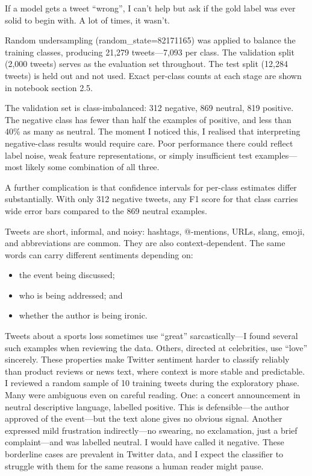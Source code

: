 \documentclass[12pt]{article}
\begin{document}
  If a model gets a tweet ``wrong'', I can't help but ask if the gold label was ever solid to begin with.
  A lot of times, it wasn't.

Random undersampling (random\_state=82171165) was applied to balance the training classes, producing 21,279 tweets---7,093 per class.
The validation split (2,000 tweets) serves as the evaluation set throughout.
The test split (12,284 tweets) is held out and not used.
Exact per-class counts at each stage are shown in notebook section 2.5.

The validation set is class-imbalanced: 312 negative, 869 neutral, 819 positive.
The negative class has fewer than half the examples of positive, and less than 40\% as many as neutral.
The moment I noticed this, I realised that interpreting negative-class results would require care.
Poor performance there could reflect label noise, weak feature representations, or simply insufficient test examples---most likely some combination of all three.

A further complication is that confidence intervals for per-class estimates differ substantially.
With only 312 negative tweets, any F1 score for that class carries wide error bars compared to the 869 neutral examples.

Tweets are short, informal, and noisy: hashtags, @-mentions, URLs, slang, emoji, and abbreviations are common. They are also context-dependent. The same words can carry different sentiments depending on:

\begin{itemize}

  \item the event being discussed;

  \item who is being addressed; and

  \item whether the author is being ironic.

\end{itemize} Tweets about a sports loss sometimes use ``great'' sarcastically---I found several such examples when reviewing the data. Others, directed at celebrities, use ``love'' sincerely. These properties make Twitter sentiment harder to classify reliably than product reviews or news text, where context is more stable and predictable. 
I reviewed a random sample of 10 training tweets during the exploratory phase. Many were ambiguous even on careful reading. One: a concert announcement in neutral descriptive language, labelled positive. This is defensible---the author approved of the event---but the text alone gives no obvious signal. Another expressed mild frustration indirectly---no swearing, no exclamation, just a brief complaint---and was labelled neutral. I would have called it negative. These borderline cases are prevalent in Twitter data, and I expect the classifier to struggle with them for the same reasons a human reader might pause.
\end{document}
